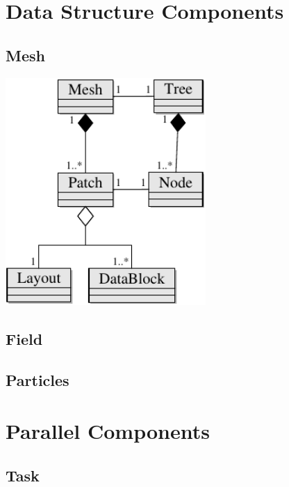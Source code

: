 \documentclass{paper}
\begin{document}
\section{Data Structure Components}
\subsection{Mesh}
\centerline{\includegraphics[width=3in]{uml/amr.pdf}}
\subsection{Field}
\subsection{Particles}
\section{Parallel Components}
\subsection{Task}
\end{document}

